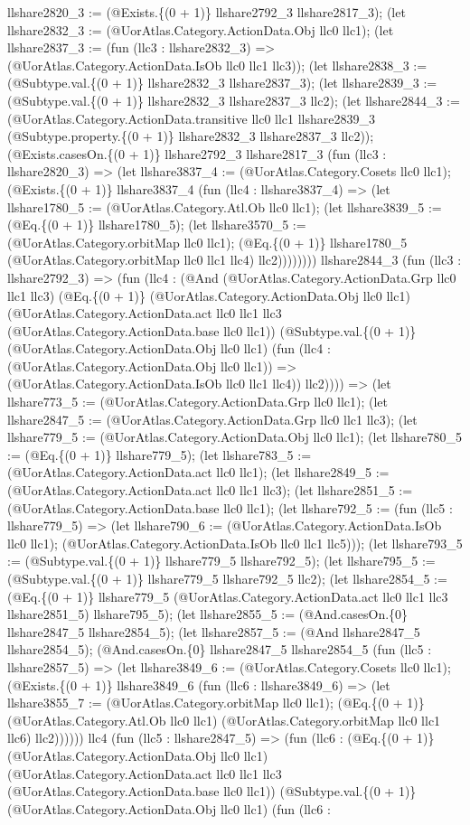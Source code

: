 \documentclass[11pt]{article}
\begin{document}
llshare2820\_3 := (@Exists.\{(0 + 1)\} llshare2792\_3 llshare2817\_3); (let llshare2832\_3 := (@UorAtlas.Category.ActionData.Obj llc0 llc1); (let llshare2837\_3 := (fun (llc3 : llshare2832\_3) => (@UorAtlas.Category.ActionData.IsOb llc0 llc1 llc3)); (let llshare2838\_3 := (@Subtype.val.\{(0 + 1)\} llshare2832\_3 llshare2837\_3); (let llshare2839\_3 := (@Subtype.val.\{(0 + 1)\} llshare2832\_3 llshare2837\_3 llc2); (let llshare2844\_3 := (@UorAtlas.Category.ActionData.transitive llc0 llc1 llshare2839\_3 (@Subtype.property.\{(0 + 1)\} llshare2832\_3 llshare2837\_3 llc2)); (@Exists.casesOn.\{(0 + 1)\} llshare2792\_3 llshare2817\_3 (fun (llc3 : llshare2820\_3) => (let llshare3837\_4 := (@UorAtlas.Category.Cosets llc0 llc1); (@Exists.\{(0 + 1)\} llshare3837\_4 (fun (llc4 : llshare3837\_4) => (let llshare1780\_5 := (@UorAtlas.Category.Atl.Ob llc0 llc1); (let llshare3839\_5 := (@Eq.\{(0 + 1)\} llshare1780\_5); (let llshare3570\_5 := (@UorAtlas.Category.orbitMap llc0 llc1); (@Eq.\{(0 + 1)\} llshare1780\_5 (@UorAtlas.Category.orbitMap llc0 llc1 llc4) llc2)))))))) llshare2844\_3 (fun (llc3 : llshare2792\_3) => (fun (llc4 : (@And (@UorAtlas.Category.ActionData.Grp llc0 llc1 llc3) (@Eq.\{(0 + 1)\} (@UorAtlas.Category.ActionData.Obj llc0 llc1) (@UorAtlas.Category.ActionData.act llc0 llc1 llc3 (@UorAtlas.Category.ActionData.base llc0 llc1)) (@Subtype.val.\{(0 + 1)\} (@UorAtlas.Category.ActionData.Obj llc0 llc1) (fun (llc4 : (@UorAtlas.Category.ActionData.Obj llc0 llc1)) => (@UorAtlas.Category.ActionData.IsOb llc0 llc1 llc4)) llc2)))) => (let llshare773\_5 := (@UorAtlas.Category.ActionData.Grp llc0 llc1); (let llshare2847\_5 := (@UorAtlas.Category.ActionData.Grp llc0 llc1 llc3); (let llshare779\_5 := (@UorAtlas.Category.ActionData.Obj llc0 llc1); (let llshare780\_5 := (@Eq.\{(0 + 1)\} llshare779\_5); (let llshare783\_5 := (@UorAtlas.Category.ActionData.act llc0 llc1); (let llshare2849\_5 := (@UorAtlas.Category.ActionData.act llc0 llc1 llc3); (let llshare2851\_5 := (@UorAtlas.Category.ActionData.base llc0 llc1); (let llshare792\_5 := (fun (llc5 : llshare779\_5) => (let llshare790\_6 := (@UorAtlas.Category.ActionData.IsOb llc0 llc1); (@UorAtlas.Category.ActionData.IsOb llc0 llc1 llc5))); (let llshare793\_5 := (@Subtype.val.\{(0 + 1)\} llshare779\_5 llshare792\_5); (let llshare795\_5 := (@Subtype.val.\{(0 + 1)\} llshare779\_5 llshare792\_5 llc2); (let llshare2854\_5 := (@Eq.\{(0 + 1)\} llshare779\_5 (@UorAtlas.Category.ActionData.act llc0 llc1 llc3 llshare2851\_5) llshare795\_5); (let llshare2855\_5 := (@And.casesOn.\{0\} llshare2847\_5 llshare2854\_5); (let llshare2857\_5 := (@And llshare2847\_5 llshare2854\_5); (@And.casesOn.\{0\} llshare2847\_5 llshare2854\_5 (fun (llc5 : llshare2857\_5) => (let llshare3849\_6 := (@UorAtlas.Category.Cosets llc0 llc1); (@Exists.\{(0 + 1)\} llshare3849\_6 (fun (llc6 : llshare3849\_6) => (let llshare3855\_7 := (@UorAtlas.Category.orbitMap llc0 llc1); (@Eq.\{(0 + 1)\} (@UorAtlas.Category.Atl.Ob llc0 llc1) (@UorAtlas.Category.orbitMap llc0 llc1 llc6) llc2)))))) llc4 (fun (llc5 : llshare2847\_5) => (fun (llc6 : (@Eq.\{(0 + 1)\} (@UorAtlas.Category.ActionData.Obj llc0 llc1) (@UorAtlas.Category.ActionData.act llc0 llc1 llc3 (@UorAtlas.Category.ActionData.base llc0 llc1)) (@Subtype.val.\{(0 + 1)\} (@UorAtlas.Category.ActionData.Obj llc0 llc1) (fun (llc6 : 
\end{document}
